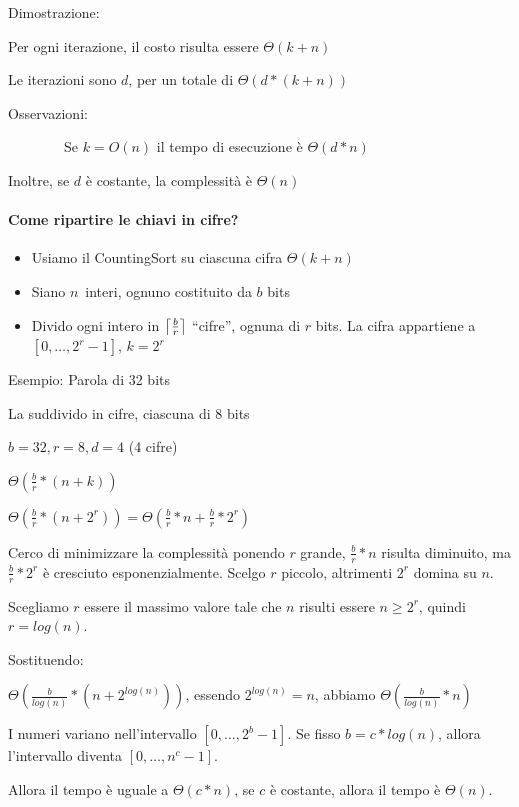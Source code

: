 \documentclass[tikz]{article}
\DeclarePairedDelimiter\ceil{\lceil}{\rceil}
\providecommand{\tightlist}{%
  \setlength{\itemsep}{0pt}\setlength{\parskip}{0pt}}
\let\oldparagraph\paragraph
\renewcommand{\paragraph}[1]{\oldparagraph{#1}\mbox{}}
\begin{document}
{Dimostrazione:}

{Per ogni iterazione, il costo risulta essere $\Theta(k+n)$}

{Le iterazioni sono $d$, per un totale di $\Theta(d*(k+n))$}

{Osservazioni:}

{~~~~~~~~Se $k=O(n)$ il tempo di esecuzione è $\Theta(d*n)$}

{Inoltre, se $d$ è costante, la complessità è $\Theta(n)$}

\paragraph{Come ripartire le chiavi in cifre?}

\begin{itemize}
\tightlist
\item
  {Usiamo il CountingSort su ciascuna cifra $\Theta(k+n)$}
\item
  {Siano }$n${~interi, ognuno costituito da $b$ bits}
\item
  {Divido ogni intero in $\ceil*{\frac{b}{r}}$ ``cifre'', ognuna di $r$ bits. La cifra appartiene a $[0,\ldots,2^r-1]$, $k=2^r$}
\end{itemize}

{Esempio: Parola di 32 bits}

{La suddivido in cifre, ciascuna di 8 bits}

$b=32, r=8, d=4$ (4 cifre)

$\Theta(\frac{b}{r}*(n+k))$

$\Theta(\frac{b}{r}*(n+2^r)) = \Theta(\frac{b}{r}*n + \frac{b}{r}*2^r)$

{Cerco di minimizzare la complessità ponendo $r$ grande, $\frac{b}{r}*n$ risulta diminuito, ma $\frac{b}{r}*2^r$ è cresciuto esponenzialmente. Scelgo $r$ piccolo, altrimenti $2^r$ domina su $n$.}

{Scegliamo $r$ essere il massimo valore tale che $n$ risulti essere $n\geq 2^r$, quindi $r=log(n)$.}

{Sostituendo:}

{$\Theta(\frac{b}{log(n)}*(n+2^{log(n)}))$, essendo $2^{log(n)} = n$, abbiamo $\Theta(\frac{b}{log(n)}*n)$}

{I numeri variano nell'intervallo $[0,\ldots,2^b-1]$. Se fisso $b=c*log(n)$, allora l'intervallo diventa $[0,\ldots,n^c-1]$.}

{Allora il tempo è uguale a $\Theta(c*n)$, se $c$ è costante, allora il tempo è $\Theta(n)$.}
\end{document}
